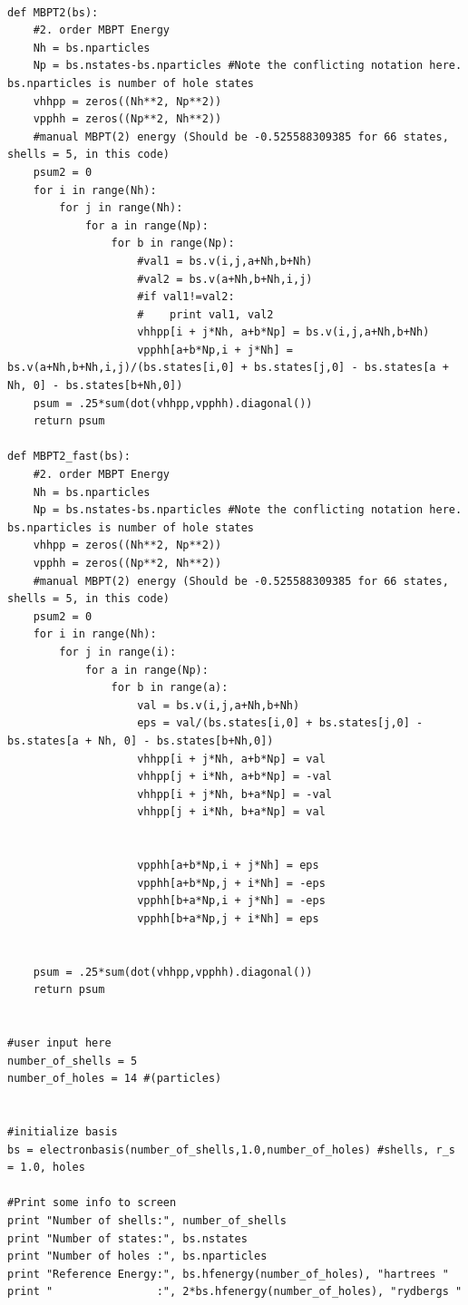\documentclass[%
oneside,                 %
final,                   %
10pt]{article}
\newenvironment{doconceexercise}{}{}
\begin{document}
\begin{doconceexercise}
\begin{verbatim}
        
def MBPT2(bs):
    #2. order MBPT Energy 
    Nh = bs.nparticles
    Np = bs.nstates-bs.nparticles #Note the conflicting notation here. bs.nparticles is number of hole states 
    vhhpp = zeros((Nh**2, Np**2))
    vpphh = zeros((Np**2, Nh**2))
    #manual MBPT(2) energy (Should be -0.525588309385 for 66 states, shells = 5, in this code)
    psum2 = 0
    for i in range(Nh):
        for j in range(Nh):
            for a in range(Np):
                for b in range(Np):
                    #val1 = bs.v(i,j,a+Nh,b+Nh)
                    #val2 = bs.v(a+Nh,b+Nh,i,j)
                    #if val1!=val2:
                    #    print val1, val2
                    vhhpp[i + j*Nh, a+b*Np] = bs.v(i,j,a+Nh,b+Nh)
                    vpphh[a+b*Np,i + j*Nh] = bs.v(a+Nh,b+Nh,i,j)/(bs.states[i,0] + bs.states[j,0] - bs.states[a + Nh, 0] - bs.states[b+Nh,0])
    psum = .25*sum(dot(vhhpp,vpphh).diagonal())
    return psum
    
def MBPT2_fast(bs):
    #2. order MBPT Energy 
    Nh = bs.nparticles
    Np = bs.nstates-bs.nparticles #Note the conflicting notation here. bs.nparticles is number of hole states 
    vhhpp = zeros((Nh**2, Np**2))
    vpphh = zeros((Np**2, Nh**2))
    #manual MBPT(2) energy (Should be -0.525588309385 for 66 states, shells = 5, in this code)
    psum2 = 0
    for i in range(Nh):
        for j in range(i):
            for a in range(Np):
                for b in range(a):
                    val = bs.v(i,j,a+Nh,b+Nh)
                    eps = val/(bs.states[i,0] + bs.states[j,0] - bs.states[a + Nh, 0] - bs.states[b+Nh,0])
                    vhhpp[i + j*Nh, a+b*Np] = val 
                    vhhpp[j + i*Nh, a+b*Np] = -val 
                    vhhpp[i + j*Nh, b+a*Np] = -val
                    vhhpp[j + i*Nh, b+a*Np] = val 
        
                    
                    vpphh[a+b*Np,i + j*Nh] = eps
                    vpphh[a+b*Np,j + i*Nh] = -eps
                    vpphh[b+a*Np,i + j*Nh] = -eps
                    vpphh[b+a*Np,j + i*Nh] = eps
                    
                    
    psum = .25*sum(dot(vhhpp,vpphh).diagonal())
    return psum


#user input here
number_of_shells = 5
number_of_holes = 14 #(particles)


#initialize basis    
bs = electronbasis(number_of_shells,1.0,number_of_holes) #shells, r_s = 1.0, holes

#Print some info to screen
print "Number of shells:", number_of_shells
print "Number of states:", bs.nstates
print "Number of holes :", bs.nparticles
print "Reference Energy:", bs.hfenergy(number_of_holes), "hartrees "
print "                :", 2*bs.hfenergy(number_of_holes), "rydbergs "


\end{verbatim}
\end{doconceexercise}
\end{document}
